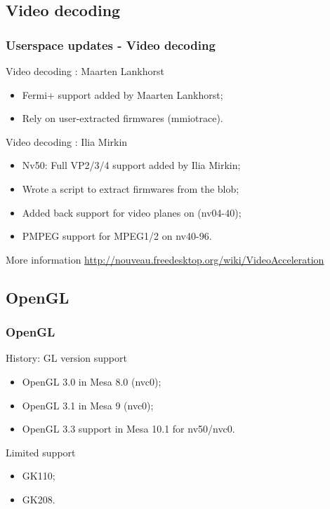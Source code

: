\documentclass[11pt,english,compress]{beamer}
\begin{document}
\subsection{Video decoding}
\begin{frame}
	\frametitle{Userspace updates - Video decoding}

	\begin{block}{Video decoding : Maarten Lankhorst}
		\begin{itemize}
			\item Fermi+ support added by Maarten Lankhorst;
			\item Rely on user-extracted firmwares (mmiotrace).
		\end{itemize}
	\end{block}

	\begin{block}{Video decoding : Ilia Mirkin}
		\begin{itemize}
			\item Nv50: Full VP2/3/4 support added by Ilia Mirkin;
			\item Wrote a script to extract firmwares from the blob;
			\item Added back support for video planes on (nv04-40);
			\item PMPEG support for MPEG1/2 on nv40-96.
		\end{itemize}
	\end{block}

	\begin{block}{More information}
		\url{http://nouveau.freedesktop.org/wiki/VideoAcceleration}
	\end{block}
\end{frame}

\subsection{OpenGL}

\begin{frame}
	\frametitle{OpenGL}

	\begin{block}{History: GL version support}
		\begin{itemize}
			\item OpenGL 3.0 in Mesa 8.0 (nvc0);
			\item OpenGL 3.1 in Mesa 9 (nvc0);
			\item OpenGL 3.3 support in Mesa 10.1 for nv50/nvc0.
		\end{itemize}
	\end{block}

	\begin{block}{Limited support}
		\begin{itemize}
			\item GK110;
			\item GK208.
		\end{itemize}
	\end{block}
\end{frame}
\end{document}
